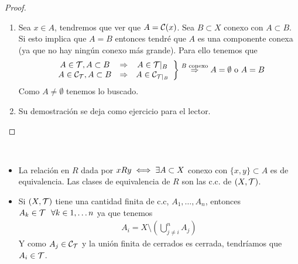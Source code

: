 \begin{prop}
\begin{proof}
\begin{enumerate}
            \item[(v)] Sea $x\in A$, tendremos que ver que $A=\mathcal{C}(x)$. Sea $B\subset X$ conexo con $A\subset B$. Si esto implica que $A=B$ entonces tendré que $A$ es una componente conexa (ya que no hay ningún conexo más grande). Para ello tenemos que 
            \begin{align*}
                \left.
                \begin{array}{ccc}
                    A\in \mathcal{T}, A\subset B & \Rightarrow & A \in \mathcal{T}|_B \\
                    A \in \mathcal{C}_{\mathcal{T}}, A\subset B & \Rightarrow & A\in \mathcal{C}_{\mathcal{T}|_B}\\
                \end{array}
                \right\} \overset{B \text{ conexo}}{\Rightarrow} A =\emptyset \text{ o } A=B
            \end{align*}
            Como $A\neq \emptyset$ tenemos lo buscado.
            \item[(vi)] Su demostración se deja como ejercicio para el lector.
        \end{enumerate}
    \end{proof}
\end{prop}

\begin{observacion}\
    \begin{itemize}
        \item La relación en $R$ dada por $xRy \iff\exists A\subset X$ conexo con $\{x,y\}\subset A$ es de equivalencia. Las clases de equivalencia de $R$ son las c.c. de $(X, \mathcal{T})$.
        \item Si $(X, \mathcal{T})$ tiene una cantidad finita de c.c, $A_1,\dots, A_n$, entonces $A_k\in \mathcal{T}\ \ \forall k\in 1,\dots n$ ya que tenemos 
        \begin{align*}
            A_i=X\setminus \left( \bigcup\limits_{j\neq i}^n A_j\right)
        \end{align*}
        Y como $A_j\in \mathcal{C}_{\mathcal{T}}$ y la unión finita de cerrados es cerrada, tendríamos que $A_i\in \mathcal{T}$.
    \end{itemize}
    \endsquare
\end{observacion}

